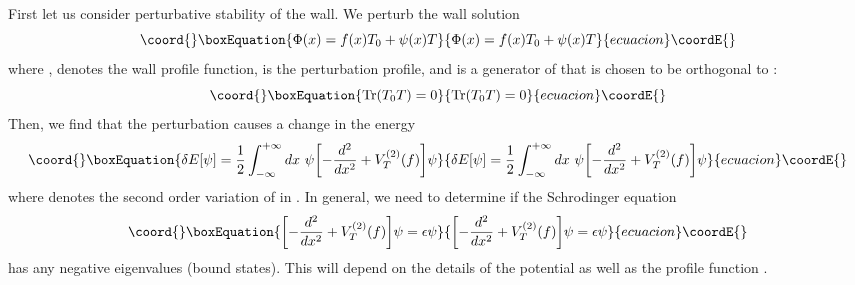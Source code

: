 \documentclass[a4paper,prd,nofootinbib,twocolumn,showpacs]{revtex4}
\begin{document}
{}First let us consider perturbative stability of the \coordHE{}
wall. We perturb the wall solution
\begin{equation}\coord{}\boxEquation{
\Phi (x) = f(x) T_0 + \psi (x) T
\label{perturbedkink}
}{
\Phi (x) = f(x) T_0 + \psi (x) T
}{ecuacion}\coordE{}\end{equation}
where \coordHE{}, \coordHE{} denotes the wall profile 
function, \coordHE{} is the perturbation profile, and \coordHE{} is a 
generator of \coordHE{} that is chosen to be orthogonal to \coordHE{}:
\begin{equation}\coord{}\boxEquation{
{\rm Tr} (T_0 T) = 0
\label{trT0t}
}{
{\rm Tr} (T_0 T) = 0
}{ecuacion}\coordE{}\end{equation}
Then, we find that the perturbation causes a change in
the energy
\begin{equation}\coord{}\boxEquation{
\delta E [\psi ] = {{1} \over 2} \int_{-\infty}^{+\infty} dx ~
  \psi \biggl [ - {{d^2}\over {dx^2}} + V_T^{(2)} (f) \biggr ] \psi
\label{deltaEpsi}
}{
\delta E [\psi ] = {{1} \over 2} \int_{-\infty}^{+\infty} dx ~
  \psi \biggl [ - {{d^2}\over {dx^2}} + V_T^{(2)} (f) \biggr ] \psi
}{ecuacion}\coordE{}\end{equation}
where \coordHE{} denotes the second order variation of 
\coordHE{} in \myHighlight{$\psi$}\coordHE{}. In general, we need to determine if the 
Schrodinger equation 
\begin{equation}\coord{}\boxEquation{
 \biggl [ - {{d^2}\over {dx^2}} + V_T^{(2)} (f) \biggr ] \psi = 
                  \epsilon \psi
\label{schrodinger}
}{
 \biggl [ - {{d^2}\over {dx^2}} + V_T^{(2)} (f) \biggr ] \psi = 
                  \epsilon \psi
}{ecuacion}\coordE{}\end{equation}
has any negative eigenvalues (bound states). This will depend on
the details of the potential \coordHE{} as well as the profile function
\coordHE{}.
\end{document}
